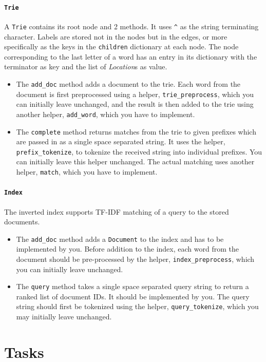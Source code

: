 \documentclass[addpoints]{exam}
\begin{document}
\paragraph{\texttt{Trie}} A \texttt{Trie} contains its root node and 2 methods. It uses \texttt{\^} as the string terminating character. Labels are stored not in the nodes but in the edges, or more specifically as the keys in the \texttt{children} dictionary at each node. The node corresponding to the last letter of a word has an entry in its dictionary with the terminator as key and the list of \textit{Location}s as value.
\begin{itemize}
\item The \texttt{add\_doc} method adds a document to the trie. Each word from the document is first preprocessed using a helper, \texttt{trie\_preprocess}, which you can initially leave unchanged, and the result is then added to the trie using another helper, \texttt{add\_word}, which you have to implement.
\item The \texttt{complete} method returns matches from the trie to given prefixes which are passed in as a single space separated string. It uses the helper, \texttt{prefix\_tokenize}, to tokenize the received string into individual prefixes. You can initially leave this helper unchanged. The actual matching uses another helper, \texttt{match}, which you have to implement.
\end{itemize}

\paragraph{\texttt{Index}} The inverted index supports TF-IDF matching of a query to the stored documents.
\begin{itemize}
\item The \texttt{add\_doc} method adds a \texttt{Document} to the index and has to be implemented by you. Before addition to the index, each word from the document should be pre-processed by the helper, \texttt{index\_preprocess}, which you can initially leave unchanged.
\item The \texttt{query} method takes a single space separated query string to return a ranked list of document IDs. It should be implemented by you. The query string should first be tokenized using the helper, \texttt{query\_tokenize}, which you may initially leave unchanged.
\end{itemize}

\section{Tasks}
\end{document}
